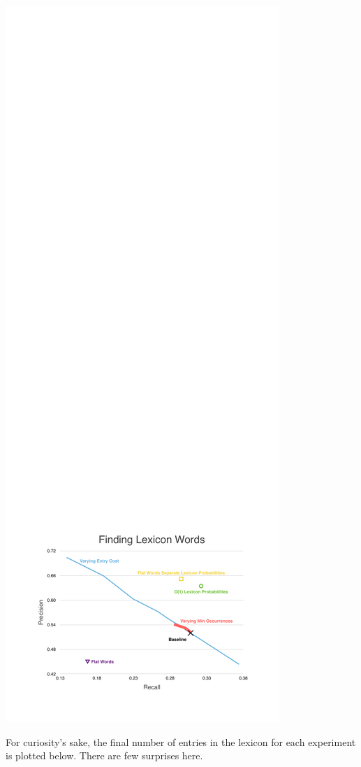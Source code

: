 \documentclass[11pt, oneside, fleqn]{article}
\begin{document}
  \includegraphics[scale=0.9]{./figure/finding_lexiocn_words.pdf}

	\pagebreak

	For curiosity's sake, the final number of entries in the lexicon for each experiment is plotted below. There are few surprises here.
\end{document}
